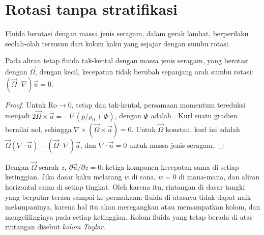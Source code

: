 \section{Rotasi tanpa stratifikasi}\label{sec:b3:gfd-foundations:taylor}

Fluida berotasi dengan massa jenis seragam, dalam gerak lambat, berperilaku seolah-olah
tersusun dari kolom kaku yang sejajar dengan sumbu rotasi.

\begin{theorem}\label{thm:b3:gfd-foundations:taylor-proudman}
Pada aliran tetap fluida tak-kental dengan massa jenis seragam, yang berotasi dengan
$\vec\Omega$, dengan  kecil, kecepatan tidak berubah sepanjang
arah sumbu rotasi: $(\vec\Omega\cdot\nabla)\vec u = 0$.
\end{theorem}

\begin{proof}
Untuk $\mathrm{Ro}\to 0$, tetap dan tak-kental, persamaan momentum tereduksi
menjadi $2\vec\Omega\times\vec u = -\nabla(p/\rho_0 + \Phi)$, dengan $\Phi$ adalah
. Kurl suatu gradien bernilai nol, sehingga $\nabla\times(\vec\Omega
\times\vec u) = 0$. Untuk $\vec\Omega$ konstan, kurl ini adalah $\vec\Omega
(\nabla\cdot\vec u) - (\vec\Omega\cdot\nabla)\vec u$, dan $\nabla\cdot\vec u
= 0$ untuk massa jenis seragam.
\end{proof}

Dengan $\vec\Omega$ searah $z$, $\partial\vec u/\partial z = 0$: ketiga
komponen kecepatan sama di setiap ketinggian. Jika dasar kaku melarang
$w$ di sana, $w = 0$ di mana-mana, dan aliran horizontal sama di setiap
tingkat. Oleh karena itu, rintangan di dasar tangki yang berputar terasa sampai
ke permukaan: fluida di atasnya tidak dapat naik melampauinya, karena
hal itu akan meregangkan atau memampatkan kolom, dan mengelilinginya pada setiap ketinggian.
Kolom fluida yang tetap berada di atas rintangan disebut \emph{kolom
Taylor}.

